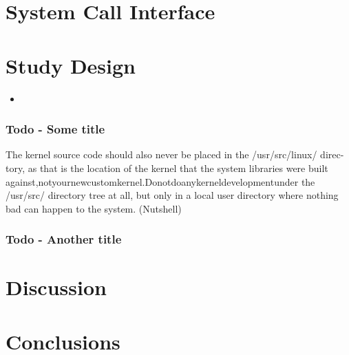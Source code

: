 \documentclass{article}
\begin{document}
\section{System Call Interface}
\lipsum[1]


\section{Study Design}
\lipsum[1]
\begin{itemize}
\item \lipsum[1]
\end{itemize}

\subsubsection{Todo - Some title}
\lipsum[1]
The kernel source code should also never be placed in the /usr/src/linux/ direc- tory, as that is the location of the kernel that the system libraries were built against,notyournewcustomkernel.Donotdoanykerneldevelopmentunder the /usr/src/ directory tree at all, but only in a local user directory where nothing bad can happen to the system.
(Nutshell)

\subsubsection{Todo - Another title}
\lipsum[1]


\section{Discussion}
\lipsum[1]

\section{Conclusions}
\lipsum[1]


\vspace{-7.5mm}
\renewcommand{\refname}{\section{References}}

\end{document}
